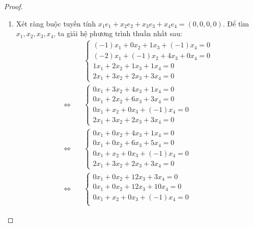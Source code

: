 \documentclass[class=linearalgebra,crop=false]{standalone}
\begin{document}
\begin{proof}
    \begin{enumerate}[label = (\alph*)]
        \item Xét ràng buộc tuyến tính $x_{1}e_{1} + x_{2}e_{2} + x_{3}e_{3} + x_{4}e_{4} = (0,0,0,0)$. Để tìm $x_{1}, x_{2}, x_{3}, x_{4}$, ta giải hệ phương trình thuần nhất sau:
              \begin{align*}
                                       & \begin{cases}
                      (-1)x_{1} + 0x_{2} + 1x_{3} + (-1)x_{4} = 0 \\
                      (-2)x_{1} + (-1)x_{2} + 4x_{3} + 0x_{4} = 0 \\
                      1x_{1} + 2x_{2} + 1x_{3} + 1x_{4} = 0       \\
                      2x_{1} + 3x_{2} + 2x_{3} + 3x_{4} = 0
                  \end{cases} \\
                  \Leftrightarrow\quad &
                  \begin{cases}
                      0x_{1} + 3x_{2} + 4x_{3} + 1x_{4} = 0   \\
                      0x_{1} + 2x_{2} + 6x_{3} + 3x_{4} = 0   \\
                      0x_{1} + x_{2} + 0x_{3} + (-1)x_{4} = 0 \\
                      2x_{1} + 3x_{2} + 2x_{3} + 3x_{4} = 0
                  \end{cases}                        \\
                  \Leftrightarrow\quad &
                  \begin{cases}
                      0x_{1} + 0x_{2} + 4x_{3} + 1x_{4} = 0   \\
                      0x_{1} + 0x_{2} + 6x_{3} + 5x_{4} = 0   \\
                      0x_{1} + x_{2} + 0x_{3} + (-1)x_{4} = 0 \\
                      2x_{1} + 3x_{2} + 2x_{3} + 3x_{4} = 0
                  \end{cases}                        \\
                  \Leftrightarrow\quad &
                  \begin{cases}
                      0x_{1} + 0x_{2} + 12x_{3} + 3x_{4} = 0  \\
                      0x_{1} + 0x_{2} + 12x_{3} + 10x_{4} = 0 \\
                      0x_{1} + x_{2} + 0x_{3} + (-1)x_{4} = 0 \\

\end{cases}
\end{align*}
\end{enumerate}
\end{proof}
\end{document}
